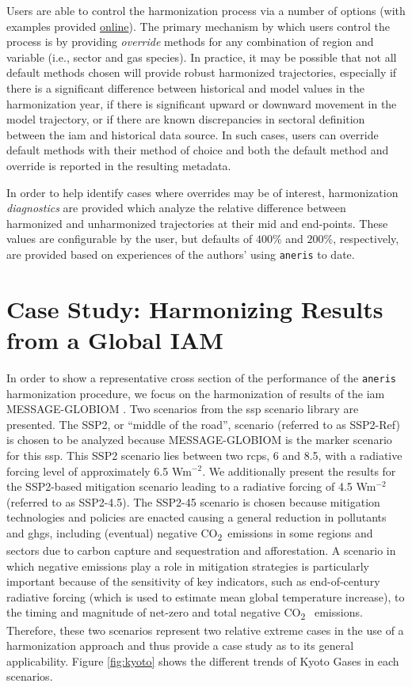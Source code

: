 \documentclass[review]{elsarticle}
\newcommand{\code}[1]{\lstinline[basicstyle=\ttfamily\color{black}]|#1|}
\newcommand{\cotwo}{CO\textsubscript{2}~}
\begin{document}
Users are able to control the harmonization process via a number of options
(with examples provided
\href{http://mattgidden.com/aneris/config.html}{online}). The primary mechanism
by which users control the process is by providing \textit{override} methods for
any combination of region and variable (i.e., sector and gas species).  In
practice, it may be possible that not all default methods chosen will provide
robust harmonized trajectories, especially if there is a significant difference
between historical and model values in the harmonization year, if there is
significant upward or downward movement in the model trajectory, or if there are
known discrepancies in sectoral definition between the \gls{iam} and historical data
source. In such cases, users can override default methods with their method of
choice and both the default method and override is reported in the resulting
metadata.

In order to help identify cases where overrides may be of interest,
harmonization \textit{diagnostics} are provided which analyze the relative
difference between harmonized and unharmonized trajectories at their mid and
end-points. These values are configurable by the user, but defaults of $400$\%
and $200$\%, respectively, are provided based on experiences of the authors'
using \code{aneris} to date.

\section{Case Study: Harmonizing Results from a Global IAM}\label{sec:results}

In order to show a representative cross section of the performance of the
\code{aneris} harmonization procedure, we focus on the harmonization of results
of the \gls{iam} MESSAGE-GLOBIOM \cite{fricko_marker_2017}. Two scenarios from the \gls{ssp}
scenario library \cite{Riahi2017153,Rao2017346} are presented. The SSP2, or
``middle of the road'', scenario (referred to as SSP2-Ref) is chosen to be
analyzed because MESSAGE-GLOBIOM is the marker scenario for this \gls{ssp}. This SSP2
scenario lies between two \glspl{rcp}, 6 and 8.5, with a radiative forcing level of
approximately 6.5 Wm$^{-2}$. We additionally present the results for the
SSP2-based mitigation scenario leading to a radiative forcing of 4.5 Wm$^{-2}$
(referred to as SSP2-4.5). The SSP2-45 scenario is chosen because mitigation
technologies and policies are enacted causing a general reduction in pollutants
and \glspl{ghg}, including (eventual) negative \cotwo emissions in some regions and
sectors due to carbon capture and sequestration and afforestation. A scenario in
which negative emissions play a role in mitigation strategies is particularly
important because of the sensitivity of key indicators, such as end-of-century
radiative forcing (which is used to estimate mean global temperature increase),
to the timing and magnitude of net-zero and total negative \cotwo
emissions. Therefore, these two scenarios represent two relative extreme cases
in the use of a harmonization approach and thus provide a case study as to its
general applicability. Figure \ref{fig:kyoto} shows the different trends of
Kyoto Gases in each scenarios.
\end{document}
